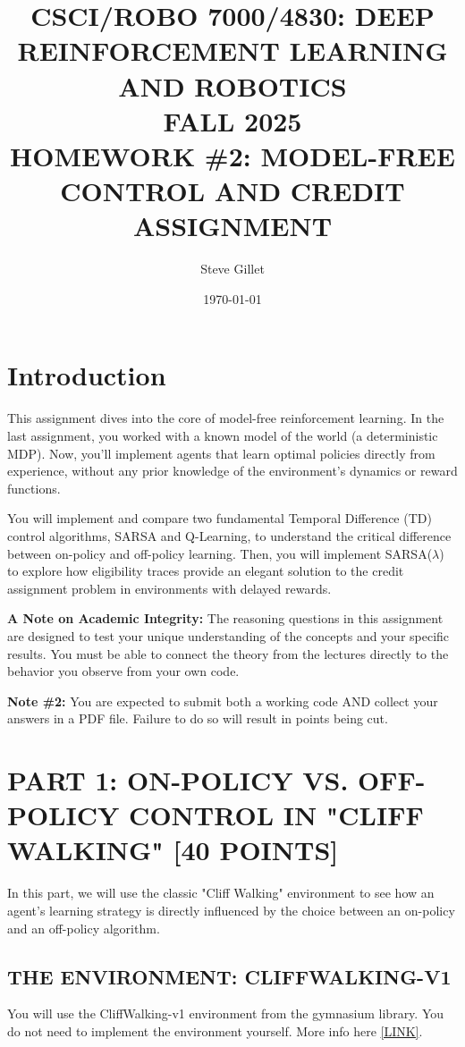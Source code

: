 \documentclass{article}
\title{CSCI/ROBO 7000/4830: DEEP REINFORCEMENT LEARNING AND ROBOTICS \\ FALL 2025 \\ HOMEWORK \#2: MODEL-FREE CONTROL AND CREDIT ASSIGNMENT}
\author{Steve Gillet}
\date{\today}
\begin{document}
\maketitle

\section{Introduction}

This assignment dives into the core of model-free reinforcement learning. In the last assignment, you worked with a known model of the world (a deterministic MDP). Now, you'll implement agents that learn optimal policies directly from experience, without any prior knowledge of the environment's dynamics or reward functions.

You will implement and compare two fundamental Temporal Difference (TD) control algorithms, SARSA and Q-Learning, to understand the critical difference between on-policy and off-policy learning. Then, you will implement SARSA($\lambda$) to explore how eligibility traces provide an elegant solution to the credit assignment problem in environments with delayed rewards.

\textbf{A Note on Academic Integrity:} The reasoning questions in this assignment are designed to test your unique understanding of the concepts and your specific results. You must be able to connect the theory from the lectures directly to the behavior you observe from your own code.

\textbf{Note \#2:} You are expected to submit both a working code AND collect your answers in a PDF file. Failure to do so will result in points being cut.

\section{PART 1: ON-POLICY VS. OFF-POLICY CONTROL IN "CLIFF WALKING" [40 POINTS]}

In this part, we will use the classic "Cliff Walking" environment to see how an agent's learning strategy is directly influenced by the choice between an on-policy and an off-policy algorithm.

\subsection{THE ENVIRONMENT: CLIFFWALKING-V1}

You will use the CliffWalking-v1 environment from the gymnasium library. You do not need to implement the environment yourself. More info here \href{[LINK]}{[LINK]}.
\end{document}
